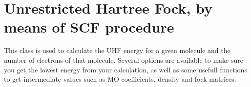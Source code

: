 \documentclass[letterpaper,10pt,english]{sphinxmanual}
\begin{document}
\label{\detokenize{UHF:module-ghf.UHF}}

\chapter{Unrestricted Hartree Fock, by means of SCF procedure}
\label{\detokenize{UHF:unrestricted-hartree-fock-by-means-of-scf-procedure}}\label{\detokenize{UHF::doc}}
This class is used to calculate the UHF energy for a given molecule and the number of electrons of that molecule.
Several options are available to make sure you get the lowest energy from your calculation, as well as some usefull
functions to get intermediate values such as MO coefficients, density and fock matrices.
\end{document}
